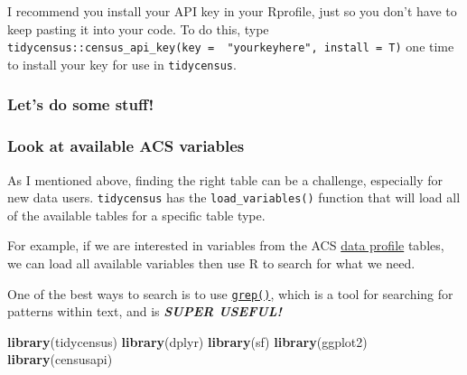 \documentclass[]{article}
\newenvironment{Shaded}{\begin{snugshade}}{\end{snugshade}}
\newcommand{\KeywordTok}[1]{\textcolor[rgb]{0.13,0.29,0.53}{\textbf{#1}}}
\newcommand{\DataTypeTok}[1]{\textcolor[rgb]{0.13,0.29,0.53}{#1}}
\newcommand{\DecValTok}[1]{\textcolor[rgb]{0.00,0.00,0.81}{#1}}
\newcommand{\StringTok}[1]{\textcolor[rgb]{0.31,0.60,0.02}{#1}}
\newcommand{\CommentTok}[1]{\textcolor[rgb]{0.56,0.35,0.01}{\textit{#1}}}
\newcommand{\OtherTok}[1]{\textcolor[rgb]{0.56,0.35,0.01}{#1}}
\newcommand{\OperatorTok}[1]{\textcolor[rgb]{0.81,0.36,0.00}{\textbf{#1}}}
\newcommand{\NormalTok}[1]{#1}
\begin{document}
I recommend you install your API key in your Rprofile, just so you don't
have to keep pasting it into your code. To do this, type
\texttt{tidycensus::census\_api\_key(key\ =\ \ "yourkeyhere",\ install\ =\ T)}
one time to install your key for use in \texttt{tidycensus}.

\subsubsection{Let's do some stuff!}\label{lets-do-some-stuff}

\newpage

\subsubsection{Look at available ACS
variables}\label{look-at-available-acs-variables}

As I mentioned above, finding the right table can be a challenge,
especially for new data users. \texttt{tidycensus} has the
\texttt{load\_variables()} function that will load all of the available
tables for a specific table type.

For example, if we are interested in variables from the ACS
\href{https://www.census.gov/acs/www/data/data-tables-and-tools/data-profiles/2016/}{data
profile} tables, we can load all available variables then use R to
search for what we need.

One of the best ways to search is to use
\href{https://en.wikipedia.org/wiki/Grep}{\texttt{grep()}}, which is a
tool for searching for patterns within text, and is \textbf{\emph{SUPER
USEFUL!}}

\begin{Shaded}
\begin{Highlighting}[]
\KeywordTok{library}\NormalTok{(tidycensus)}
\KeywordTok{library}\NormalTok{(dplyr)}
\KeywordTok{library}\NormalTok{(sf)}
\KeywordTok{library}\NormalTok{(ggplot2)}
\KeywordTok{library}\NormalTok{(censusapi)}
\end{Highlighting}
\end{Shaded}

\begin{Shaded}
\end{Shaded}
\end{document}
